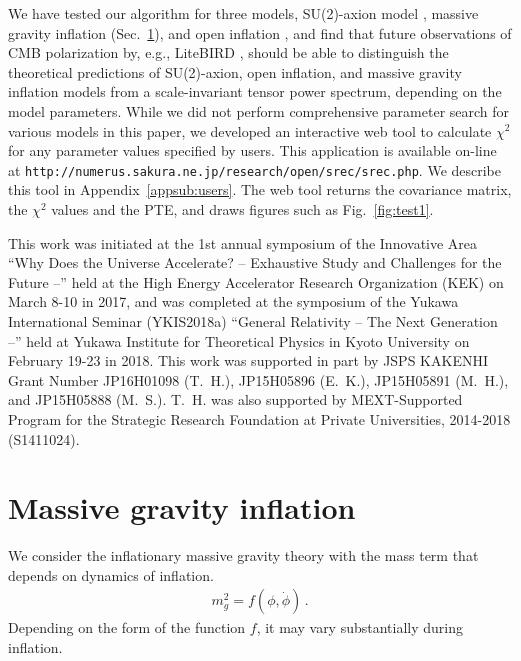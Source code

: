 \documentclass[tightenlines,floats,aps,nofootinbib,prd,onecolumn,preprintnumbers]{revtex4}
\begin{document}
We have tested our algorithm for three models, SU(2)-axion model \cite{Dimastrogiovanni:2016fuu}, massive
gravity inflation (Sec.~\ref{appsub:model}), and open inflation \cite{Yamauchi:2011qq}, and find that future observations
of CMB polarization by, e.g., LiteBIRD \cite{Matsumura:2013aja}, should
be able to distinguish the theoretical predictions of SU(2)-axion,
open inflation, and massive gravity inflation models from a
scale-invariant tensor power spectrum, depending on the model parameters. While we did not perform comprehensive parameter search for
various models in this paper, we developed an interactive web tool to calculate $\chi^2$ for
any parameter values specified by users.  This application is available
on-line at {\tt http://numerus.sakura.ne.jp/research/open/srec/srec.php}. We describe
this tool in Appendix~\ref{appsub:users}. The web tool returns the
covariance matrix, the $\chi^2$ values and the PTE, and draws figures such as
Fig.~\ref{fig:test1}. 

\begin{acknowledgments}
 This work was initiated at the 1st annual symposium of the Innovative Area ``Why Does the Universe Accelerate? -- Exhaustive Study and Challenges for the Future --'' held at the High Energy Accelerator Research Organization (KEK) on March 8-10 in 2017, and was completed at the symposium of the Yukawa International Seminar (YKIS2018a) ``General Relativity -- The Next Generation --'' held at Yukawa Institute for Theoretical Physics in Kyoto University on February 19-23 in 2018.
 This work was supported in part by JSPS KAKENHI Grant Number
 JP16H01098 (T.~H.), JP15H05896 (E.~K.), JP15H05891 (M.~H.), and
 JP15H05888 (M.~S.). T.~H. was also supported by
MEXT-Supported Program for the Strategic Research Foundation at Private Universities,
2014-2018 (S1411024).
\end{acknowledgments}

\appendix
\section{Massive gravity inflation}
\label{appsub:model}
We consider the inflationary massive gravity theory
with the mass term that depends on dynamics of inflation.
%
\begin{align}
m_g^2=f(\phi,\dot\phi)\,.
\end{align}
%
Depending on the form of the function $f$, it may vary 
substantially during inflation. 
\end{document}
